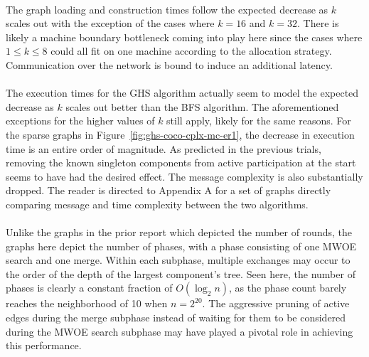 \documentclass[11pt,epsf]{article}
\begin{document}
{{    \paragraph{}{
      The graph loading and construction times follow the expected decrease as $k$ scales out with the exception of the cases where
      $k = 16$ and $k = 32$. There is likely a machine boundary bottleneck coming into play here since the cases where $1 \leq k \leq 8$
      could all fit on one machine according to the allocation strategy. Communication over the network is bound to induce an additional latency.
    }
    \paragraph{}{
      The execution times for the GHS algorithm actually seem to model the expected decrease as $k$ scales out better than the
      BFS algorithm. The aforementioned exceptions for the higher values of $k$ still apply, likely for the same reasons.
      For the sparse graphs in Figure~\ref{fig:ghs-coco-cplx-mc-er1}, the decrease in execution time is an entire order
      of magnitude. As predicted in the previous trials, removing the known singleton components from active participation
      at the start seems to have had the desired effect. The message complexity is also substantially dropped.
      The reader is directed to Appendix A for a set of graphs directly comparing message and time complexity between
      the two algorithms.
    }
    \paragraph{}{
      Unlike the graphs in the prior report which depicted the number of rounds, the graphs here depict the number of
      phases, with a phase consisting of one MWOE search and one merge. Within each subphase, multiple exchanges
      may occur to the order of the depth of the largest component's tree. Seen here, the number of phases is
      clearly a constant fraction of $O(\log_2 n)$, as the phase count barely reaches the neighborhood of 10
      when $n = 2^{20}$. The aggressive pruning of active edges during the merge subphase instead of waiting
      for them to be considered during the MWOE search subphase may have played a pivotal role in achieving this performance.
    }
}}
\end{document}
